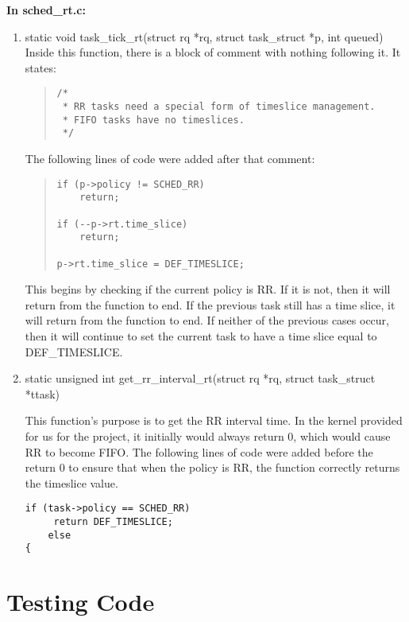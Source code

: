 \documentclass[letterpaper,10pt,titlepage]{article}
\begin{document}
{\bfseries In sched\_rt.c:}

\begin{enumerate}[resume]
\item static void task\_tick\_rt(struct rq *rq, struct task\_struct *p, int queued)
Inside this function, there is a block of comment with nothing following it. It states:
\begin{quotation}
\begin{verbatim}
/*
 * RR tasks need a special form of timeslice management.
 * FIFO tasks have no timeslices.
 */
\end{verbatim}
\end{quotation}
The following lines of code were added after that comment:
\begin{quotation}
\begin{verbatim}
if (p->policy != SCHED_RR)
    return;

if (--p->rt.time_slice)
    return;

p->rt.time_slice = DEF_TIMESLICE;
\end{verbatim}
\end{quotation}
This begins by checking if the current policy is RR. If it is not, then it will return from the function to end. If the previous task still has a time slice, it will return from the function to end. If neither of the previous cases occur, then it will continue to set the current task to have a time slice equal to DEF\_TIMESLICE.


\item static unsigned int get\_rr\_interval\_rt(struct rq *rq, struct task\_struct *ttask)

    This function's purpose is to get the RR interval time. In the kernel provided for us for the project, it initially would always return 0, which would cause
    RR to become FIFO. The following lines of code were added before the return 0 to ensure that when the policy is RR, the
    function correctly returns the timeslice value.
\begin{verbatim}
if (task->policy == SCHED_RR)
     return DEF_TIMESLICE;
    else
{
\end{verbatim}
\end{enumerate}

\section{Testing Code}

\end{document}
